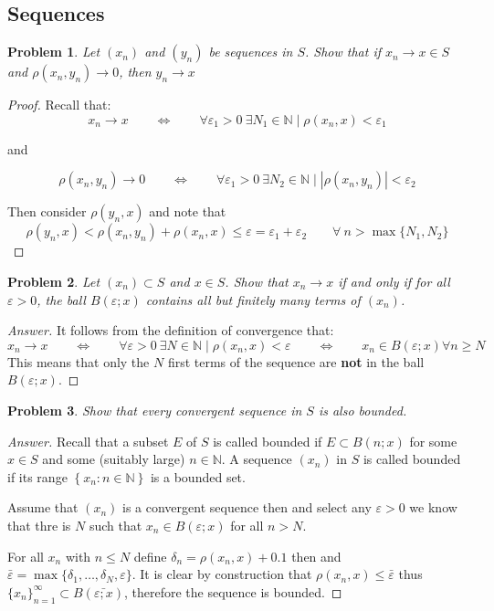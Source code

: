 \documentclass{article}
\newtheorem{problem}{Problem}
\newcommand{\qiffq}{\qquad \iff \qquad}
\begin{document}
\subsection{Sequences}
\begin{problem}
    Let $\left(x_{n}\right)$ and $\left(y_{n}\right)$ be sequences in $S$. Show that if $x_{n} \rightarrow x \in S$ and $\rho\left(x_{n}, y_{n}\right) \rightarrow 0$, then $y_{n} \rightarrow x$
\end{problem}

\begin{proof}
    Recall that:
    $$x_n \to x \qiffq \forall\varepsilon_1 > 0 \: \exists N_1\in \mathbb{N} \mid \rho(x_n,x)< \varepsilon_1$$

    and 

    $$\rho(x_n,y_n) \to 0 \qiffq \forall\varepsilon_1 > 0 \: \exists N_2\in \mathbb{N} \mid |\rho(x_n,y_n)|< \varepsilon_2$$

    Then consider $\rho(y_n,x)$ and note that
    $$\rho(y_n,x)<\rho(x_n,y_n) + \rho(x_n,x) \leq \varepsilon = \varepsilon_1 + \varepsilon_2 \qquad \forall \:n > \max\{N_1,N_2\}$$
\end{proof}

\begin{problem}
    Let $\left(x_{n}\right) \subset S$ and $x \in S$. Show that $x_{n} \rightarrow x$ if and only if for all $\varepsilon>0$, the ball $B(\varepsilon ; x)$ contains all but finitely many terms of $\left(x_{n}\right)$.
\end{problem}

\begin{proof}[Answer]
    It follows from the definition of convergence that:
    $$x_n \to x \qiffq \forall \varepsilon > 0 \: \exists N \in \mathbb{N} \mid \rho(x_n,x)< \varepsilon \qiffq x_n \in B(\varepsilon; x) \forall n \geq N$$
    This means that only the $N$ first terms of the sequence are \textbf{not} in the ball $B(\varepsilon;x)$.
\end{proof}

\begin{problem}
    Show that every convergent sequence in $S$ is also bounded.
\end{problem}

\begin{proof}[Answer]
    Recall that a subset $E$ of $S$ is called bounded if $E \subset B(n ; x)$ for some $x \in S$ and some (suitably large) $n \in \mathbb{N}$. A sequence $\left(x_{n}\right)$ in $S$ is called bounded if its range $\left\{x_{n}: n \in \mathbb{N}\right\}$ is a bounded set.

    Assume that $(x_n)$ is a convergent sequence then and select any $\varepsilon>0$ we know that thre is $N$ such that $x_n\in B(\varepsilon; x)$ for all $n>N$.

    For all $x_n$ with $n\leq N$ define $\delta_n = \rho(x_n, x) + 0.1$ then and $\bar{\varepsilon} = \max\{\delta_1,\ldots,\delta_N,\varepsilon\}$. It is clear by construction that $\rho(x_n,x)\leq \bar{\varepsilon}$ thus $\{x_n\}_{n=1}^\infty \subset B(\bar{\varepsilon; x})$, therefore the sequence is bounded.
\end{proof}
\end{document}
